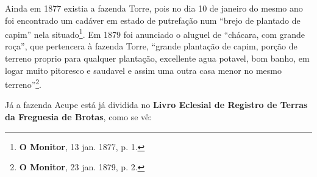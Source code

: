 
Ainda em 1877 existia a fazenda Torre, pois no dia 10 de janeiro do mesmo ano foi encontrado um cadáver em estado de putrefação num ``brejo de plantado de capim'' nela situado\footnote{\textbf{O Monitor}, 13 jan. 1877, p. 1.}. Em 1879 foi anunciado o aluguel de ``chácara, com grande roça'', que pertencera à fazenda Torre, ``grande plantação de capim, porção de terreno proprio para qualquer plantação, excellente agua potavel, bom banho, em logar muito pitoresco e saudavel e assim uma outra casa menor no mesmo terreno''\footnote{\textbf{O Monitor}, 23 jan. 1879, p. 2.}.

Já a fazenda Acupe está já dividida no \textbf{Livro Eclesial de Registro de Terras da Freguesia de Brotas}, como se vê:

